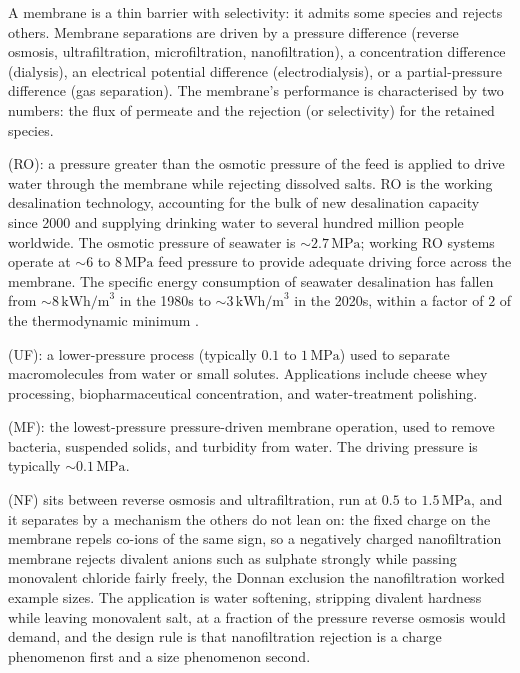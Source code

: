 A membrane is a thin barrier with selectivity: it admits some
species and rejects others. Membrane separations are driven by a
pressure difference (reverse osmosis, ultrafiltration,
microfiltration, nanofiltration), a concentration difference
(dialysis), an electrical potential difference (electrodialysis), or
a partial-pressure difference (gas separation). The membrane's
performance is characterised by two numbers: the flux of permeate
and the rejection (or selectivity) for the retained species.

 (RO): a pressure greater than the osmotic
pressure of the feed is applied to drive water through the membrane
while rejecting dissolved salts. RO is the working desalination
technology, accounting for the bulk of new desalination capacity
since 2000 and supplying drinking water to several hundred million
people worldwide. The osmotic pressure of seawater is $\sim 2.7\,\text{MPa}$;
working RO systems operate at $\sim 6$ to $8\,\text{MPa}$ feed pressure
to provide adequate driving force across the membrane. The specific
energy consumption of seawater desalination has fallen from $\sim 8\,
\text{kWh/m}^3$ in the 1980s to $\sim 3\,\text{kWh/m}^3$ in the 2020s,
within a factor of $2$ of the thermodynamic minimum
\cite{gen:mackay2009}.

 (UF): a lower-pressure process (typically
$0.1$ to $1\,\text{MPa}$) used to separate macromolecules from water
or small solutes. Applications include cheese whey processing,
biopharmaceutical concentration, and water-treatment polishing.

 (MF): the lowest-pressure pressure-driven
membrane operation, used to remove bacteria, suspended solids, and
turbidity from water. The driving pressure is typically $\sim
0.1\,\text{MPa}$.

 (NF) sits between reverse osmosis and
ultrafiltration, run at $0.5$ to $1.5\,\text{MPa}$, and it separates by a
mechanism the others do not lean on: the fixed charge on the membrane repels
co-ions of the same sign, so a negatively charged nanofiltration membrane
rejects divalent anions such as sulphate strongly while passing monovalent
chloride fairly freely, the Donnan exclusion the nanofiltration worked example
sizes. The application is water softening, stripping divalent hardness while
leaving monovalent salt, at a fraction of the pressure reverse osmosis would
demand, and the design rule is that nanofiltration rejection is a charge
phenomenon first and a size phenomenon second.


